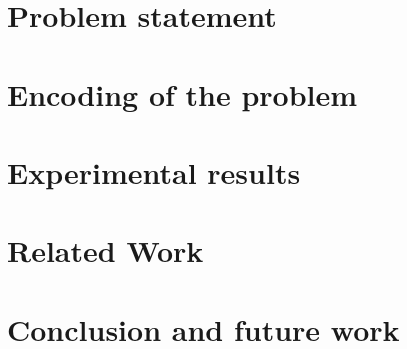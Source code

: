 \documentclass[]{llncs}
\begin{document}
\section{Problem statement}
\label{sec:problem}


\section{Encoding of the problem}
\label{sec:encoding}


\section{Experimental results}
\label{sec:experiments}


\section{Related Work}
\label{sec:related}


\section{Conclusion and future work}
\label{sec:conclusion}





\appendix
\clearpage
\end{document}
